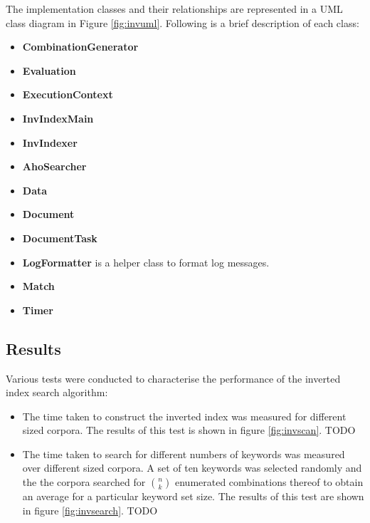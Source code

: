 \documentclass[10pt]{report}
\begin{document}
The implementation classes and their relationships are represented in a UML
class diagram in Figure \ref{fig:invuml}. Following is a brief
description of each class:

\begin{itemize}
\item \textbf{CombinationGenerator}

\item \textbf{Evaluation}

\item \textbf{ExecutionContext} 

\item \textbf{InvIndexMain}

\item \textbf{InvIndexer}

\item \textbf{AhoSearcher} 

\item \textbf{Data} 

\item \textbf{Document} 

\item \textbf{DocumentTask} 

\item \textbf{LogFormatter} is a helper class to format log messages.

\item \textbf{Match}

\item \textbf{Timer}

\end{itemize}


\subsection*{Results}
Various tests were conducted to characterise the performance of the inverted index search algorithm:

\begin{itemize}
\item The time taken to construct the inverted index was measured for different sized corpora. The results of this test is shown in figure \ref{fig:invscan}. TODO

\item The time taken to search for different numbers of keywords was measured over different sized corpora. A set of ten keywords was selected randomly and the the corpora searched for ${n \choose k}$ enumerated combinations thereof to obtain an average for a particular keyword set size. The results of this test are shown in figure \ref{fig:invsearch}. TODO
\end{itemize}
\end{document}
